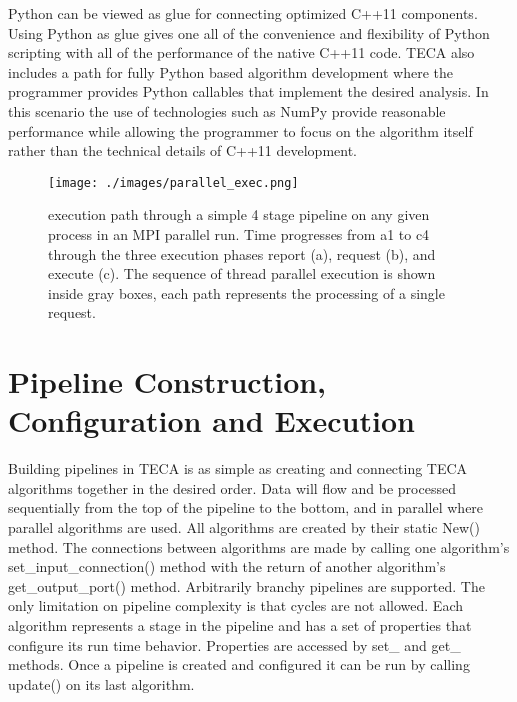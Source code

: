 \documentclass[a4paper,10pt,DIV=12]{scrreprt}
\begin{document}
Python can be viewed as glue for connecting optimized C++11 components. Using Python as glue gives one all of the convenience and flexibility of Python scripting with all of the performance of the native C++11 code. TECA also includes a path for fully Python based algorithm development where the programmer provides Python callables that implement the desired analysis. In this scenario the use of technologies such as NumPy provide reasonable performance while allowing the programmer to focus on the algorithm itself rather than the technical details of C++11 development.

\begin{figure}[h]
 \centering
 \texttt{[image: ./images/parallel\_exec.png]}
 \caption{\small  execution path through a simple 4 stage pipeline on any given process in an MPI parallel run. Time progresses from a1 to c4 through the three execution phases report (a), request (b), and execute (c). The sequence of thread parallel execution is shown inside gray boxes, each path represents the processing of a single request.}
 \label{fig:parallel_exec}
\end{figure}

\section{Pipeline Construction, Configuration and Execution}
\label{sec:py_glue}
Building pipelines in TECA is as simple as creating and connecting TECA algorithms together in the desired order. Data will flow and be processed sequentially from the top of the pipeline to the bottom, and in parallel where parallel algorithms are used. All algorithms are created by their static New() method. The connections between algorithms are made by calling one algorithm's set\_input\_connection() method with the return of another algorithm's get\_output\_port() method. Arbitrarily branchy pipelines are supported. The only limitation on pipeline complexity is that cycles are not allowed. Each algorithm represents a stage in the pipeline and has a set of properties that configure its run time behavior. Properties are accessed by set\_<prop name>\(\) and get\_<prop name>\(\) methods. Once a pipeline is created and configured it can be run by calling update() on its last algorithm.
\end{document}
